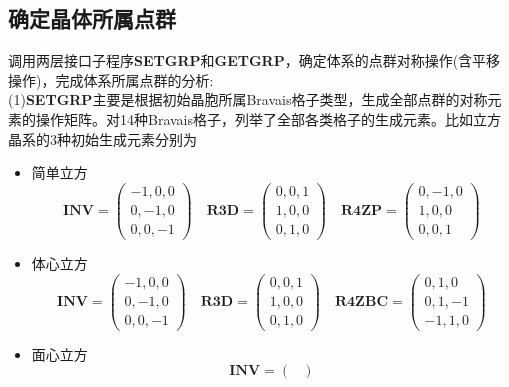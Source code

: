 \subsection{确定晶体所属点群}
调用两层接口子程序\textbf{SETGRP}和\textbf{GETGRP}，确定体系的点群对称操作(含平移操作)，完成体系所属点群的分析:~\\
(1)\textbf{SETGRP}主要是根据初始晶胞所属\textrm{Bravais}格子类型，生成全部点群的对称元素的操作矩阵。对14种\textrm{Bravais}格子，列举了全部各类格子的生成元素。比如立方晶系的3种初始生成元素分别为
\begin{itemize}
	\item 简单立方
\begin{displaymath}
	\mathbf{INV}=
	\begin{pmatrix}
		-1, 0, 0 \\ 
		0,-1, 0 \\
		0, 0, -1
	\end{pmatrix}\quad
	\mathbf{R3D}=
	\begin{pmatrix}
		0, 0, 1 \\ 
		1, 0, 0 \\
		0, 1, 0
	\end{pmatrix}\quad
	\mathbf{R4ZP}=
	\begin{pmatrix}
		0, -1, 0 \\ 
		1, 0, 0 \\
		0, 0, 1
	\end{pmatrix}
\end{displaymath}
	\item 体心立方
\begin{displaymath}
	\mathbf{INV}=
	\begin{pmatrix}
		-1, 0, 0 \\ 
		0,-1, 0 \\
		0, 0, -1
	\end{pmatrix}\quad
	\mathbf{R3D}=
	\begin{pmatrix}
		0, 0, 1 \\ 
		1, 0, 0 \\
		0, 1, 0
	\end{pmatrix}\quad
	\mathbf{R4ZBC}=
	\begin{pmatrix}
		0, 1, 0 \\ 
		0, 1, -1 \\
		-1, 1, 0
	\end{pmatrix}
\end{displaymath}
	\item 面心立方
\begin{displaymath}
	\mathbf{INV}=
	\begin{pmatrix}

\end{pmatrix}
\end{displaymath}
\end{itemize}
